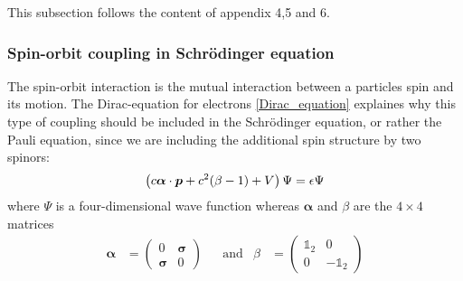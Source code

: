 	This subsection follows the content of \cite{tutorial2} appendix 4,5 and 6. 

\subsubsection{Spin-orbit coupling in Schrödinger equation}
	
	The spin-orbit interaction is the mutual interaction between a particles spin and its motion. 
	The Dirac-equation for electrons \eqref{Dirac_equation} explaines why this type of coupling should be included in the Schrödinger equation, or rather the Pauli equation, since we are including the additional spin structure by two spinors: 
	\begin{equation} \label{Dirac_equation}
		\left(
			c \boldsymbol\alpha \cdot \boldsymbol{p} + c^2(\beta - 1) + V
		\right) \Psi = \epsilon \Psi
	\end{equation}
	where $\Psi$ is a four-dimensional wave function whereas $\boldsymbol{\alpha}$ and $\beta$ are the $4 \times 4$ matrices
	\begin{align}
		\boldsymbol\alpha &= 
		\begin{pmatrix}
			0 & \boldsymbol{\sigma} \\
			\boldsymbol{\sigma} & 0
		\end{pmatrix} & &\text{and} &
		\beta &= 
		\begin{pmatrix}
		\mathds{1}_2 & 0 \\
		0 & -\mathds{1}_2
		\end{pmatrix}
	\end{align}
